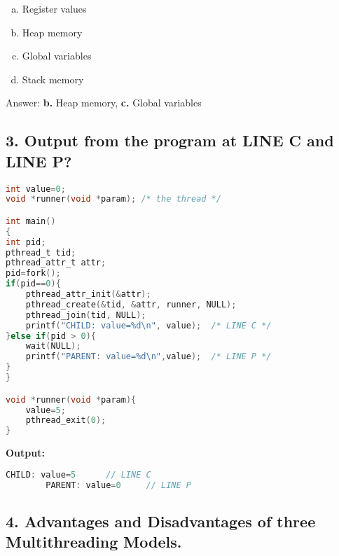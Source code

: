 \documentclass[11pt]{article}
\begin{document}
    \begin{enumerate}[a.]
        \item Register values
        \item Heap memory
        \item Global variables
        \item Stack memory
    \end{enumerate}

    Answer: \textbf{b.} Heap memory, \textbf{c.} Global variables

\subsection*{3. Output from the program at LINE C and LINE P?}

    \begin{lstlisting}[language = C]
int value=0;
void *runner(void *param); /* the thread */

int main()
{
int pid;
pthread_t tid;
pthread_attr_t attr;
pid=fork();
if(pid==0){
    pthread_attr_init(&attr);
    pthread_create(&tid, &attr, runner, NULL);
    pthread_join(tid, NULL);
    printf("CHILD: value=%d\n", value);  /* LINE C */
}else if(pid > 0){
    wait(NULL);
    printf("PARENT: value=%d\n",value);  /* LINE P */
}
}

void *runner(void *param){
    value=5;
    pthread_exit(0);
}
    \end{lstlisting}

    \textbf{Output:}
    \begin{lstlisting}[language = C]
        CHILD: value=5      // LINE C
        PARENT: value=0     // LINE P
    \end{lstlisting}

\subsection*{4. Advantages and Disadvantages of three Multithreading Models.}
\end{document}
